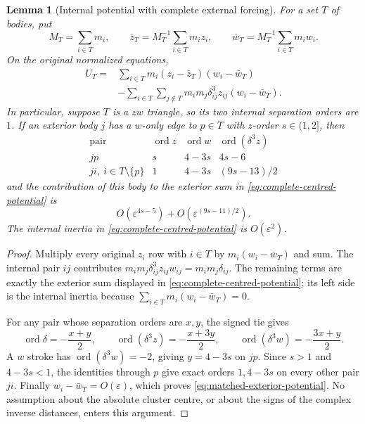 \documentclass[11pt]{amsart}
\newtheorem{lemma}[theorem]{Lemma}
\theoremstyle{remark}
\newcommand{\ord}{\operatorname{ord}}
\begin{document}
\begin{lemma}[Internal potential with complete external forcing]
\label{lem:complete-cluster-potential}
For a set $T$ of bodies, put
\[
 M_T=\sum_{i\in T}m_i,\qquad
 \bar z_T=M_T^{-1}\sum_{i\in T}m_i z_i,\qquad
 \bar w_T=M_T^{-1}\sum_{i\in T}m_i w_i.
\]
On the original normalized equations,
\begin{equation}\label{eq:complete-centred-potential}
\begin{aligned}
 U_T={}&\sum_{i\in T}m_i(z_i-\bar z_T)(w_i-\bar w_T)\\
 &-\sum_{i\in T}\sum_{j\notin T}
 m_im_j\delta_{ij}^3z_{ij}(w_i-\bar w_T).
\end{aligned}
\end{equation}
In particular, suppose $T$ is a $zw$ triangle, so its two internal separation orders are $1$. If an exterior body $j$ has a $w$-only edge to $p\in T$ with $z$-order $s\in(1,2]$, then
\[
\begin{array}{c|c|c|c}
\text{pair}&\ord z&\ord w&\ord(\delta^3z)\\ \hline
 jp&s&4-3s&4s-6\\
 ji,\ i\in T\setminus\{p\}&1&4-3s&(9s-13)/2
\end{array}
\]
and the contribution of this body to the exterior sum in
\eqref{eq:complete-centred-potential} is
\begin{equation}\label{eq:matched-exterior-potential}
 O(\varepsilon^{4s-5})+
 O\!\left(\varepsilon^{(9s-11)/2}\right).
\end{equation}
The internal inertia in \eqref{eq:complete-centred-potential} is $O(\varepsilon^2)$.
\end{lemma}
\begin{proof}
Multiply every original $z_i$ row with $i\in T$ by
$m_i(w_i-\bar w_T)$ and sum. The internal pair $ij$ contributes
$m_im_j\delta_{ij}^3z_{ij}w_{ij}=m_im_j\delta_{ij}$.
The remaining terms are exactly the exterior sum displayed in
\eqref{eq:complete-centred-potential}; its left side is the internal inertia because $\sum_{i\in T}m_i(w_i-\bar w_T)=0$.

For any pair whose separation orders are $x,y$, the signed tie gives
\begin{equation}\label{eq:force-order-formulas}
 \ord\delta=-\frac{x+y}{2},\qquad
 \ord(\delta^3z)=-\frac{x+3y}{2},\qquad
 \ord(\delta^3w)=-\frac{3x+y}{2}.
\end{equation}
A $w$ stroke has $\ord(\delta^3w)=-2$, giving $y=4-3s$ on $jp$. Since $s>1$ and $4-3s<1$, the identities through $p$ give exact orders $1,4-3s$ on every other pair $ji$. Finally $w_i-\bar w_T=O(\varepsilon)$, which proves \eqref{eq:matched-exterior-potential}. No assumption about the absolute cluster centre, or about the signs of the complex inverse distances, enters this argument.
\end{proof}
\end{document}
